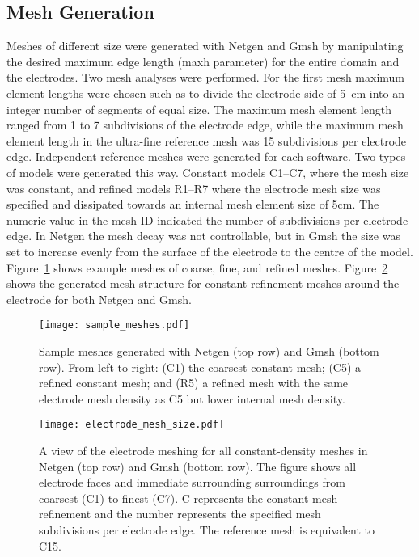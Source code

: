 \documentclass[12pt]{iopart}
\begin{document}
\subsection{Mesh Generation}
Meshes of different size were generated with Netgen and Gmsh by manipulating the desired
maximum edge length (maxh parameter) for the entire domain and the electrodes.
Two  mesh analyses were performed. For the first
mesh maximum element lengths were
chosen such as to divide the electrode side of 5~cm into an integer number of
segments of equal size. 
The maximum mesh element length ranged from 1 to 7 subdivisions of the electrode 
edge, while the maximum mesh element length in the ultra-fine reference mesh  
was 15 subdivisions per 
electrode edge. Independent reference meshes were generated for each software.
Two types of models were generated this way. Constant models C1--C7, where the mesh size 
was constant, and refined models R1--R7 where the electrode mesh size was specified and 
dissipated towards an internal mesh element size of 5cm. The numeric value in the mesh 
ID indicated the number of subdivisions per electrode edge. 
In Netgen the mesh decay was not controllable, but in Gmsh the size was set 
to increase evenly from the surface of the electrode to the centre of the model.
Figure~\ref{fig:sample_meshes} shows example meshes of coarse, fine, and refined
meshes. Figure~\ref{fig:electrode_mesh_size} shows the generated mesh structure for 
constant refinement meshes around the electrode 
for both Netgen and Gmsh. 

\begin{figure}
   \texttt{[image: sample\_meshes.pdf]}
   \caption{\label{fig:sample_meshes} Sample meshes generated with Netgen (top row)
   and Gmsh (bottom row). From left to right: (C1) the coarsest constant
   mesh; (C5) a refined constant mesh; and (R5) a refined mesh with the same
   electrode mesh density as C5 but lower internal mesh density.}
\end{figure}

\begin{figure}
  \texttt{[image: electrode\_mesh\_size.pdf]}
  \caption{\label{fig:electrode_mesh_size} A view of the electrode meshing for all constant-density meshes 
  in Netgen (top row) and Gmsh (bottom row). The figure shows all electrode faces and immediate surrounding
  surroundings from coarsest (C1) to finest (C7). C represents the constant mesh refinement and the number
  represents the specified mesh subdivisions per electrode edge. The reference mesh is equivalent to C15.}
\end{figure}
\end{document}
